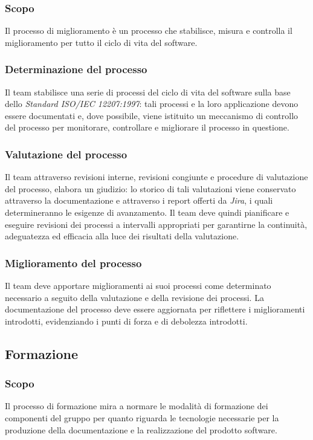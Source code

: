 \documentclass[10pt, a4paper]{article}
\begin{document}
\subsubsection{Scopo}
Il processo di miglioramento è un processo che stabilisce, misura e controlla il miglioramento per tutto il ciclo di vita del software. 

\subsubsection{Determinazione del processo}
Il team stabilisce una serie di processi del ciclo di vita del software sulla base dello \textit{Standard ISO/IEC 12207:1997}: tali processi e la loro applicazione devono essere documentati e, 
dove possibile, viene istituito un meccanismo di controllo del processo per monitorare, controllare e migliorare il processo in questione.

\subsubsection{Valutazione del processo}
Il team attraverso revisioni interne, revisioni congiunte e procedure di valutazione del processo, elabora un giudizio: lo storico di tali valutazioni
viene conservato attraverso la documentazione e attraverso i report offerti da \textit{Jira}, i quali determineranno le esigenze di avanzamento.
Il team deve quindi pianificare e eseguire revisioni dei processi a intervalli appropriati per garantirne la continuità, adeguatezza ed efficacia alla 
luce dei risultati della valutazione.

\subsubsection{Miglioramento del processo}
Il team deve apportare miglioramenti ai suoi processi come determinato necessario a seguito della valutazione e della revisione dei processi.
La documentazione del processo deve essere aggiornata per riflettere i miglioramenti introdotti, evidenziando i punti di forza e di debolezza introdotti.

\subsection{Formazione}
\subsubsection{Scopo}
Il processo di formazione mira a normare le modalità di formazione dei componenti del gruppo per quanto riguarda le tecnologie necessarie per la produzione della documentazione e la realizzazione del prodotto software.
\end{document}
